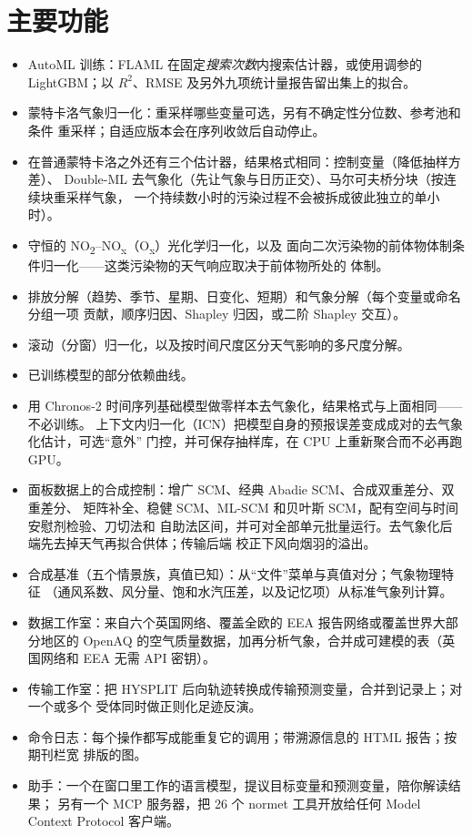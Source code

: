 \documentclass[11pt]{ctexrep}
\newcommand{\nosep}{\setlength{\itemsep}{0pt}\setlength{\parskip}{0pt}\setlength{\topsep}{2pt}}
\newcommand{\nm}{\textsf{normet}}
\newcommand{\NOtwo}{NO\textsubscript{2}}
\begin{document}
\section{主要功能}
\begin{itemize}\nosep
  \item AutoML 训练：FLAML 在固定\emph{搜索次数}内搜索估计器，或使用调参的 LightGBM；以
        $R^2$、RMSE 及另外九项统计量报告留出集上的拟合。
  \item 蒙特卡洛气象归一化：重采样哪些变量可选，另有不确定性分位数、参考池和条件
        重采样；自适应版本会在序列收敛后自动停止。
  \item 在普通蒙特卡洛之外还有三个估计器，结果格式相同：控制变量（降低抽样方差）、
        Double-ML 去气象化（先让气象与日历正交）、马尔可夫桥分块（按连续块重采样气象，
        一个持续数小时的污染过程不会被拆成彼此独立的单小时）。
  \item 守恒的 \NOtwo{}--NO\textsubscript{x}（O\textsubscript{x}）光化学归一化，以及
        面向二次污染物的前体物体制条件归一化——这类污染物的天气响应取决于前体物所处的
        体制。
  \item 排放分解（趋势、季节、星期、日变化、短期）和气象分解（每个变量或命名分组一项
        贡献，顺序归因、Shapley 归因，或二阶 Shapley 交互）。
  \item 滚动（分窗）归一化，以及按时间尺度区分天气影响的多尺度分解。
  \item 已训练模型的部分依赖曲线。
  \item 用 Chronos-2 时间序列基础模型做零样本去气象化，结果格式与上面相同——不必训练。
        上下文内归一化（ICN）把模型自身的预报误差变成成对的去气象化估计，可选“意外”
        门控，并可保存抽样库，在 CPU 上重新聚合而不必再跑 GPU。
  \item 面板数据上的合成控制：增广 SCM、经典 Abadie SCM、合成双重差分、双重差分、
        矩阵补全、稳健 SCM、ML-SCM 和贝叶斯 SCM，配有空间与时间安慰剂检验、刀切法和
        自助法区间，并可对全部单元批量运行。去气象化后端先去掉天气再拟合供体；传输后端
        校正下风向烟羽的溢出。
  \item 合成基准（五个情景族，真值已知）：从“文件”菜单与真值对分；气象物理特征
        （通风系数、风分量、饱和水汽压差，以及记忆项）从标准气象列计算。
  \item 数据工作室：来自六个英国网络、覆盖全欧的 EEA 报告网络或覆盖世界大部分地区的
        OpenAQ 的空气质量数据，加再分析气象，合并成可建模的表（英国网络和 EEA 无需
        API 密钥）。
  \item 传输工作室：把 HYSPLIT 后向轨迹转换成传输预测变量，合并到记录上；对一个或多个
        受体同时做正则化足迹反演。
  \item 命令日志：每个操作都写成能重复它的调用；带溯源信息的 HTML 报告；按期刊栏宽
        排版的图。
  \item 助手：一个在窗口里工作的语言模型，提议目标变量和预测变量，陪你解读结果；
        另有一个 MCP 服务器，把 26 个 \nm{} 工具开放给任何 Model Context Protocol
        客户端。
\end{itemize}
\end{document}
